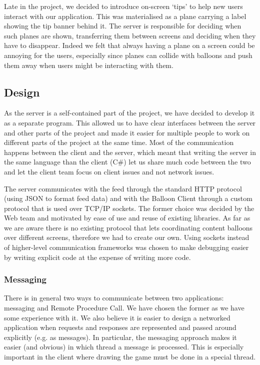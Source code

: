 Late in the project, we decided to introduce on-screen `tips' to help new users
interact with our application. This was materialised as a plane carrying a label
showing the tip banner behind it. The server is responsible for deciding when 
such planes are shown, transferring them between screens and deciding when they
have to disappear. Indeed we felt that always having a plane on a screen could
be annoying for the users, especially since planes can collide with balloons 
and push them away when users might be interacting with them.

\clearpage{}
\subsection{Design}

As the server is a self-contained part of the project, we have decided to 
develop it as a separate program. This allowed us to have clear interfaces 
between the server and other parts of the project and made it easier for
multiple people to work on different parts of the project at the same time.
Most of the communication happens between the client and the server, which 
meant that writing the server in the same language than the client (C\#) let us 
share much code between the two and let the client team focus on client issues 
and not network issues.

The server communicates with the feed through the standard HTTP protocol 
(using JSON to format feed data) and with the Balloon Client through a custom 
protocol that is used over TCP/IP sockets. The former choice was decided by the 
Web team and motivated by ease of use and reuse of existing libraries. As far 
as we are aware there is no existing protocol that lets coordinating content
balloons over different screens, therefore we had to create our own. Using 
sockets instead of higher-level communication frameworks was chosen 
to make debugging easier by writing explicit code at the expense of writing 
more code.

\subsubsection{Messaging}

There is in general two ways to communicate between two applications: messaging 
and Remote Procedure Call. We have chosen the former as we have some experience 
with it. We also believe it is easier to design a networked application when 
requests and responses are represented and passed around explicitly (e.g. as 
messages). In particular, the messaging approach makes it easier (and obvious) 
in which thread a message is processed. This is especially important in the 
client where drawing the game must be done in a special thread.

